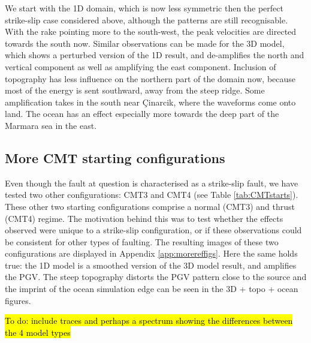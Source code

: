\documentclass[../Text/00main.tex]{subfiles}
\begin{document}
We start with the 1D domain, which is now less symmetric then the perfect strike-slip case considered above, although the patterns are still recognisable. With the rake pointing more to the south-west, the peak velocities are directed towards the south now. Similar observations can be made for the 3D model, which shows a perturbed version of the 1D result, and de-amplifies the north and vertical component as well as amplifying the east component. Inclusion of topography has less influence on the northern part of the domain now, because most of the energy is sent southward, away from the steep ridge. Some amplification takes in the south near Çinarcik, where the waveforms come onto land. The ocean has an effect especially more towards the deep part of the Marmara sea in the east. 


\subsection{More CMT starting configurations}

Even though the fault at question is characterised as a strike-slip fault, we have tested two other configurations: CMT3 and CMT4 (see Table \ref{tab:CMTstarts}). These other two starting configurations comprise a normal (CMT3) and thrust (CMT4) regime. The motivation behind this was to test whether the effects observed were unique to a strike-slip configuration, or if these observations could be consistent for other types of faulting. The resulting images of these two configurations are displayed in Appendix \ref{app:morereffigs}. Here the same holds true: the 1D model is a smoothed version of the 3D model result, and amplifies the PGV. The steep topography distorts the PGV pattern close to the source and the imprint of the ocean simulation edge can be seen in the 3D + topo + ocean figures. 

\hl{To do: include traces and perhaps a spectrum showing the differences between the 4 model types}



\FloatBarrier

\end{document}
